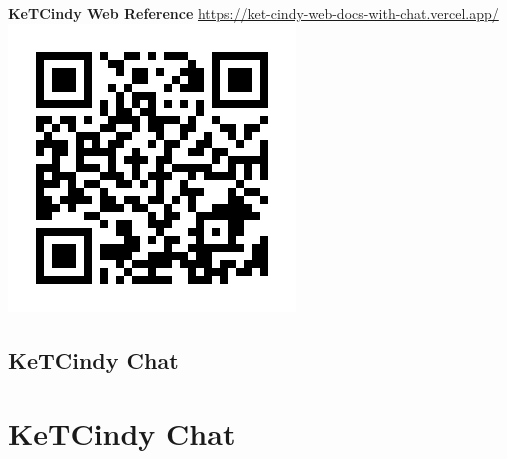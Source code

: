 \documentclass[dvipdfmx, unicode, 169]{beamer}
\begin{document}
\begin{frame}[t]{\bfseries KeTCindy Web Reference}
  \centering
  \url{https://ket-cindy-web-docs-with-chat.vercel.app/}
  \includegraphics[scale=0.75]{img/Reference/Reference_QR.png}
\end{frame}

\subsection{KeTCindy Chat}
\section*{KeTCindy Chat}


\end{document}
